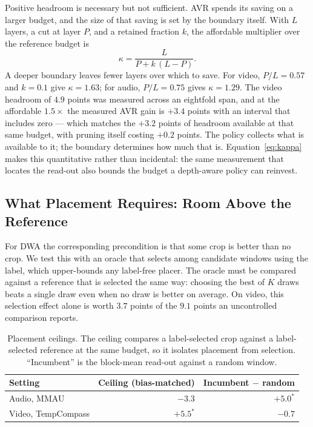 Positive headroom is necessary but not sufficient. AVR spends its saving
on a larger budget, and the size of that saving is set by the boundary
itself. With $L$ layers, a cut at layer $P$, and a retained fraction
$k$, the affordable multiplier over the reference budget is
\begin{equation}
\kappa = \frac{L}{P + k\,(L-P)} .
\label{eq:kappa}
\end{equation}
A deeper boundary leaves fewer layers over which to save. For video,
$P/L = 0.57$ and $k = 0.1$ give $\kappa = 1.63$; for audio, $P/L=0.75$
gives $\kappa = 1.29$. The video headroom of $4.9$ points was measured
across an eightfold span, and at the affordable $1.5\times$ the measured
AVR gain is $+3.4$ points with an interval that includes zero --- which
matches the $+3.2$ points of headroom available at that same budget,
with pruning itself costing $+0.2$ points. The policy collects what is
available to it; the boundary determines how much that is.
Equation~\ref{eq:kappa} makes this quantitative rather than incidental:
the same measurement that locates the read-out also bounds the budget a
depth-aware policy can reinvest.

\subsection{What Placement Requires: Room Above the Reference}

For DWA the corresponding precondition is that some crop is better than
no crop. We test this with an oracle that selects among candidate
windows using the label, which upper-bounds any label-free placer. The
oracle must be compared against a reference that is selected the same
way: choosing the best of $K$ draws beats a single draw even when no
draw is better on average. On video, this selection effect alone is
worth $3.7$ points of the $9.1$ points an uncontrolled comparison
reports.

\begin{table}[tb]
\centering\small
\caption{Placement ceilings. The ceiling compares a label-selected crop
against a label-selected reference at the same budget, so it isolates
placement from selection. ``Incumbent'' is the block-mean read-out
against a random window.}
\label{tab:crossmodal_ceiling}
\begin{tabular}{lrr}
\toprule
Setting & Ceiling (bias-matched) & Incumbent $-$ random \\
\midrule
Audio, MMAU        & $-3.3$   & $+5.0^*$ \\
Video, TempCompass & $+5.5^*$ & $-0.7$ \\
\bottomrule
\end{tabular}
\end{table}

